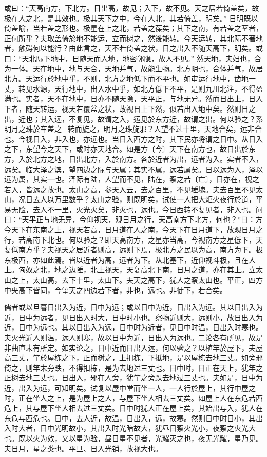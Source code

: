 \documentclass[]{article}
\begin{document}
或曰：``天高南方，下北方。日出高，故见；入下，故不见。天之居若倚盖矣，故极在人之北，是其效也。极其天下之中，今在人北，其若倚盖，明矣。''
日明既以倚盖喻，当若盖之形也。极星在上之北，若盖之葆矣；其下之南，有若盖之茎者，正何所乎？夫取盖倚於地不能运，立而树之，然後能转。今天运转，其北际不著地者，触碍何以能行？由此言之，天不若倚盖之状，日之出入不随天高下，明矣。或曰：``天北际下地中，日随天而入地，地密鄣隐，故人不见。''
然天地，夫妇也，合为一体。天在地中，地与天合，天地并气，故能生物。北方阴也，合体并气，故居北方。天运行於地中乎，不则，北方之地低下而不平也。如审运行地中，凿地一丈，转见水源，天行地中，出入水中乎，如北方低下不平，是则九川北注，不得盈满也。实者，天不在地中，日亦不随天隐，天平正，与地无异。然而日出上，日入下者，随天转运，视天若覆盆之状，故视日上下然，似若出入地中矣。然则日之出，近也；其入远，不复见，故谓之入，运见於东方近，故谓之出。何以验之？系明月之珠於车盖之，转而旋之，明月之珠旋邪？人望不过十里，天地合矣，远非合也。今视日入，非入也，亦远也。当日入西方之时，其下民亦将谓之日中。从日入之下，东望今之天下，或时亦天地合。如是方〔今〕天下在南方也，故日出於东方，入於北方之地，日出北方，入於南方。各於近者为出，远者为入。实者不入，远矣。临大泽之滨，望四边之际与天属；其实不属，远若属矣。日以远为入，泽以远为属，其实一也。泽际有陆，人望而不见，陆在，察之若〔亡〕，日亦在，视之若入，皆远之故也。太山之高，参天入云，去之百里，不见埵塊。夫去百里不见太山，况日去人以万里数乎？太山之验，则既明矣，试使一人把大炬火夜行於道，平易无险，去人不一里，火光灭矣，非灭也，远也。今日西转不复见者，非入也。问曰：``天平正与地无异，今仰视天，观日月之行，天高南方下北方，何也？''曰：方今天下在东南之上，视天若高，日月道在人之南，今天下在日月道下，故观日月之行，若高南下北也。何以验之？即天高南方，之星亦当高，今视南方之星低下，天复低南方乎？夫视天之居近者则高，远则下焉，极北方之民以为高，南方为下。极东极西，亦如此焉。皆以近者为高，远者为下。从北塞下，近仰视斗极，且在人上。匈奴之北，地之边陲，北上视天，天复高北下南，日月之道，亦在其上。立太山之上，太山高，去下十里，太山下。夫天之高下，犹人之察太山也。平正，四方中央高下皆同，今望天之四边若下者，非也，远也。非徒下，若合矣。

儒者或以旦暮日出入为近，日中为远；或以日中为近，日出入为远。其以日出入为近，日中为远者，见日出入时大，日中时小也。察物近则大，远则小，故日出入为近，日中为远也。其以日出入为远，日中时为近者，见日中时温，日出入时寒也。夫火光近人则温，远人则寒，故以日中为近，日出入为远也。二论各有所见，故是非曲直未有所定。如实论之，日中近而日出入远，何以验之？以植竿於屋下，夫屋高三丈，竿於屋栋之下，正而树之，上扣栋，下抵地，是以屋栋去地三丈。如旁邪倚之，则竿末旁跌，不得扣栋，是为去地过三丈也。日中时，日正在天上，犹竿之正树去地三丈也。日出入，邪在人旁，犹竿之旁跌去地过三丈也。夫如是，日中为近，出入为远，可知明矣。试复以屋中堂而坐一人，一人行於屋上，其行中屋之时，正在坐人之上，是为屋上之人，与屋下坐人相去三丈矣。如屋上人在东危若西危上，其与屋下坐人相去过三丈矣。日中时犹人正在屋上矣，其始出与入，犹人在东危与西危也。日中，去人近，故温，日出入，远，故寒。然则日中时日小，其出入时大者，日中光明故小，其出入时光暗故大，犹昼日察火光小，夜察之火光大也。既以火为效，又以星为验，昼日星不见者，光耀灭之也，夜无光耀，星乃见。夫日月，星之类也。平旦、日入光销，故视大也。
\end{document}
